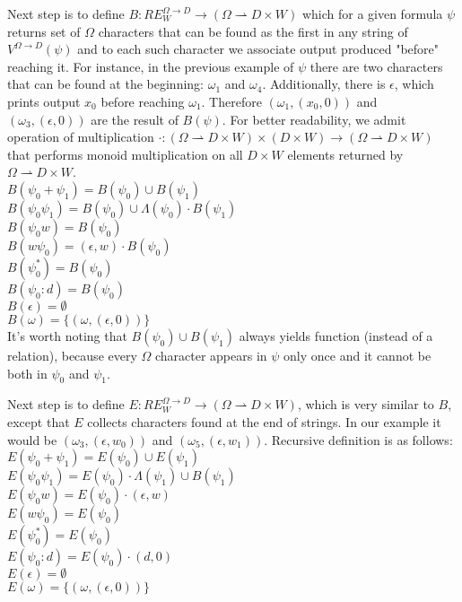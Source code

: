 Next step is to define $B:RE_W^{\Omega\rightarrow D} \rightarrow (\Omega \rightharpoonup D \times W)$ which for a given formula $\psi$ returns set of $\Omega$ characters that can be found as the first in any string of $V^{\Omega\rightarrow D}(\psi)$ and to each such character we associate output produced "before" reaching it. For instance, in the previous example of $\psi$ there are two characters that can be found at the beginning: $\omega_1$ and $\omega_4$. Additionally, there is $\epsilon$, which prints output $x_0$ before reaching $\omega_1$. Therefore $(\omega_1,(x_0,0))$ and $(\omega_3,(\epsilon,0))$ are the result of $B(\psi)$. For better readability, we admit operation of multiplication $\cdot : (\Omega \rightharpoonup D \times W) \times (D \times W) \rightarrow (\Omega \rightharpoonup D \times W)$ that performs monoid multiplication on all $D \times W$ elements returned by $\Omega \rightharpoonup D \times W$. \\
$B(\psi_0 + \psi_1) = B(\psi_0)\cup B(\psi_1) $ \\
$B(\psi_0 \psi_1) = B(\psi_0) \cup \Lambda(\psi_0)\cdot B(\psi_1)$ \\
$B(\psi_0 w) = B(\psi_0)$ \\
$B(w \psi_0 ) = (\epsilon,w)\cdot B(\psi_0)$ \\
$B(\psi_0^*) =  B(\psi_0)$ \\
$B(\psi_0 : d) =  B(\psi_0)$ \\
$B(\epsilon) =  \emptyset$ \\
$B(\omega) =  \{(\omega,(\epsilon,0)) \}$ \\
It's worth noting that $B(\psi_0)\cup B(\psi_1)$ always yields function  (instead of a relation), because every $\Omega$ character appears in $\psi$ only once and it cannot be both in $\psi_0$ and $\psi_1$. 

Next step is to define $E:RE_W^{\Omega\rightarrow D} \rightarrow (\Omega \rightharpoonup D \times W)$, which is very similar to $B$, except that $E$ collects characters found at the end of strings. In our example it would be $(\omega_3,(\epsilon,w_0))$ and $(\omega_5,(\epsilon,w_1))$. Recursive definition is as follows:\\ 
$E(\psi_0 + \psi_1) = E(\psi_0)\cup E(\psi_1) $ \\
$E(\psi_0 \psi_1) = E(\psi_0) \cdot \Lambda(\psi_1) \cup  B(\psi_1)$ \\
$E(\psi_0 w) = E(\psi_0) \cdot (\epsilon,w) $ \\
$E(w \psi_0 ) = E(\psi_0)$ \\
$E(\psi_0 ^*) =  E(\psi_0) $ \\
$E(\psi_0 : d) =  E(\psi_0) \cdot (d,0)$ \\
$E(\epsilon) =  \emptyset$ \\
$E(\omega) =  \{(\omega,(\epsilon,0)) \}$ 

